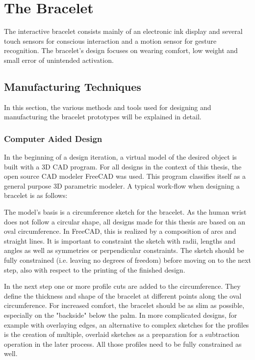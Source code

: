 \chapter{The Bracelet}

The interactive bracelet consists mainly of an electronic ink display and several touch sensors for conscious interaction and a motion sensor for gesture recognition. The bracelet's design focuses on wearing comfort, low weight and small error of unintended activation.

\section{Manufacturing Techniques}

In this section, the various methods and tools used for designing and manufacturing the bracelet prototypes will be explained in detail.

\subsection{Computer Aided Design}
In the beginning of a design iteration, a virtual model of the desired object is built with a 3D \ac{CAD} program. For all designs in the context of this thesis, the open source \ac{CAD} modeler FreeCAD\cite{freecad} was used. This program classifies itself as a general purpose 3D parametric modeler. A typical work-flow when designing a bracelet is as follows:

The model's basis is a circumference sketch for the bracelet. As the human wrist does not follow a circular shape, all designs made for this thesis are based on an oval circumference. In FreeCAD, this is realized by a composition of arcs and straight lines. It is important to constraint the sketch with radii, lengths and angles as well as symmetries or perpendicular constraints. The sketch should be fully constrained (i.e. leaving no degrees of freedom) before moving on to the next step, also with respect to the printing of the finished design.

In the next step one or more profile cuts are added to the circumference. They define the thickness and shape of the bracelet at different points along the oval circumference. For increased comfort, the bracelet should be as slim as possible, especially on the "backside" below the palm. In more complicated designs, for example with overlaying edges, an alternative to complex sketches for the profiles is the creation of multiple, overlaid sketches as a preparation for a subtraction operation in the later process. All those profiles need to be fully constrained as well.

